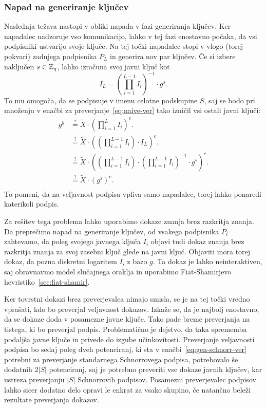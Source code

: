 \subsubsection{Napad na generiranje ključev}
Naslednja težava nastopi v obliki napada v fazi generiranja ključev. Ker napadalec nadzoruje vso
komunikacijo, lahko v tej fazi enostavno počaka, da vsi podpisniki ustvarijo svoje ključe. Na tej
točki napadalec stopi v vlogo (torej pokvari) zadnjega podpisnika $P_L$ in generira nov par ključev.
Če si izbere naključen $s \in \mathbb Z_q$, lahko izračuna svoj javni ključ kot
$$
I_L = \left( \prod_{i=1}^{L-1} I_i \right)^{-1} \cdot g^s.
$$
To mu omogoča, da se podpisuje v imenu celotne podskupine $S$, saj se bodo pri množenju v
enačbi za preverjanje~\eqref{eq:naive-ver} tako izničil vsi ostali javni ključi:
\begin{align*}
    g^{\tilde{y}} &\stackrel{?}{=} \tilde{X} \cdot \left(\prod_{i=1}^L I_i \right)^{e}. \\
                   &\stackrel{?}{=} \tilde{X} \cdot \left(\left(\prod_{i=1}^{L-1} I_i \right) \cdot I_L \right)^{e}. \\
                   &\stackrel{?}{=} \tilde{X} \cdot \left(\left(\prod_{i=1}^{L-1} I_i \right) \cdot \left( \prod_{i=1}^{L-1} I_i \right)^{-1} \cdot g^s \right)^{e}. \\
                   &\stackrel{?}{=} \tilde{X} \cdot \left( g^s \right)^{e}. \\
\end{align*}
To pomeni, da na veljavnost podpisa vpliva samo napadalec, torej lahko ponaredi katerikoli podpis.

Za rešitev tega problema lahko uporabimo dokaze znanja brez razkritja znanja. Da preprečimo napad na
generiranje ključev, od vsakega podpisnika $P_i$ zahtevamo, da poleg svojega javnega ključa $I_i$
objavi tudi dokaz znanja brez razkritja znanja za svoj zasebni ključ glede na javni ključ. Objaviti
mora torej dokaz, da pozna diskretni logaritem $I_i$ z bazo $g$. Ta dokaz je lahko neinteraktiven, saj
obravnavmo model slučajnega oraklja in uporabimo Fiat-Shamirjevo hevristiko~\ref{sec:fiat-shamir}.

Ker tovrstni dokazi brez preverjevalca nimajo smisla, se je na tej točki vredno vprašati, kdo bo preverjal
veljavnost dokazov. Izkaže se, da je najbolj enostavno, da se dokaze doda v posamezne javne ključe.
Tako pade breme preverjanja na tistega, ki bo preverjal podpis. Problematično je dejstvo, da taka
sprememba podaljša javne ključe in privede do izgube učinkovitosti. Preverjanje veljavnosti podpisa
bo sedaj poleg dveh potenciranj, ki sta v enačbi~\eqref{eq:gen-schnorr-ver} potrebni za preverjanje
standarnega Schnorrovega podpisa, potrebovalo še dodatnih $2|S|$ potenciranj, saj je potrebno
preveriti vse dokaze javnih ključev, kar ustreza preverjanju $|S|$ Schnorrovih podpisov. Posamezni
preverjevalec podpisov lahko sicer dodatno delo opravi le enkrat za vsako skupino, če natančno beleži
rezultate preverjanja dokazov.

